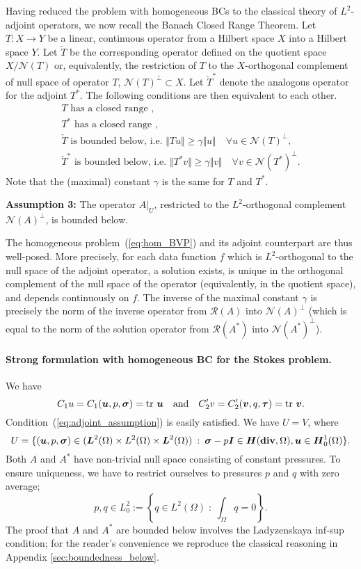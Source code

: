 Having reduced the problem with homogeneous BCs to the classical theory of
$L^2$-adjoint operators, we now recall the Banach Closed Range
Theorem. Let $T : X \to Y$ be a linear, continuous operator from a
Hilbert space $X$ into a Hilbert space $Y$. Let $\check{T}$ be the
corresponding operator defined on the quotient space
$X/\mathcal{N}(T)$ or, equivalently, the restriction of $T$ to the
$X$-orthogonal complement of null space of operator $T$,
$\mathcal{N}(T)^\perp \subset X$. Let $\check{T}^\ast$ denote the
analogous operator for the adjoint $T^\ast$.  The following
conditions are then equivalent to each other.  
\[
\begin{array}{c}
T \text{ has a closed range }, \\[8pt]
T^\ast \text{ has a closed range }, \\[8pt]
\check{T} \text{ is bounded below, i.e. } 
\Vert T u \Vert \ge \gamma \Vert u \Vert \quad \forall u \in \mathcal{N}(T)^\perp,\\[8pt]
\check{T}^\ast \text{ is bounded below, i.e. } 
\Vert T^\ast v \Vert \ge \gamma \Vert v \Vert \quad \forall v \in \mathcal{N}(T^\ast)^\perp.
\end{array}
\]
Note that the (maximal) constant $\gamma$ is the same for $T$ and $T^\ast$.

{{\bf Assumption 3:} The operator $A\vert_U$, restricted to the
  $L^2$-orthogonal complement $\mathcal{N}(A)^\perp$, is bounded
  below.}

The homogeneous problem~(\ref{eq:hom_BVP}) and its adjoint counterpart
are thus well-posed. More precisely, for each data function $f$ which is
$L^2$-orthogonal to the null space of the adjoint operator, a solution
exists, is unique in the orthogonal complement of the null space
of the operator (equivalently, in the quotient space), and
depends continuously on $f$.  The inverse of the maximal constant $\gamma$ is precisely the norm of the inverse
operator from $\mathcal{R}(A)$ into $\mathcal{N}(A)^\perp$ (which is equal to the norm of the solution operator from $\mathcal{R}(A^{\ast})$ into $\mathcal{N}(A^{\ast})^\perp$).


\paragraph*{Strong formulation with homogeneous BC for the Stokes problem.}
We have 
\[
C_1 u = C_1(\bfu,p,\bfsig) = \text{tr } \bfu \quad \text{and} \quad  
C_2^\prime v = C_2^\prime(\bfv,q,\bftau) = \text{tr } \bfv.
\]
Condition~(\ref{eq:adjoint_assumption}) is easily satisfied.
We have $U=V$, where
\[
U = \{ (\bfu,p,\bfsig) \in (\bfL^2(\Omega) \times L^2(\Omega) \times
\bfL^2(\Omega)) \: : \: \bfsig - p\bfI \in \bfH(\text{\bf
  div},\Omega), \bfu \in \bfH^1_0(\Omega) \}.
\]
Both $A$ and $A^\ast$ have non-trivial null space consisting
of constant pressures.  To ensure uniqueness, we have to
restrict ourselves to pressures $p$ and $q$ with zero average;
\[ p,q \in
L^2_{0} := \left\{ q \in L^2(\Omega) \; : \: \int_\Omega q = 0 \right\}.
\]
The proof that $A$ and $A^\ast$ are bounded below involves the
Ladyzenskaya inf-sup condition; for the reader's convenience we reproduce
the classical reasoning in Appendix \ref{sec:boundedness_below}.


